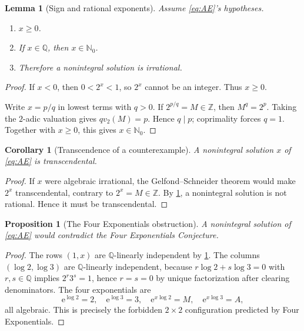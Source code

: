 \documentclass[11pt,oneside]{article}
\newtheorem{proposition}[theorem]{Proposition}
\newtheorem{lemma}[theorem]{Lemma}
\newtheorem{corollary}[theorem]{Corollary}
\theoremstyle{definition}
\theoremstyle{remark}
\newcommand{\Nzero}{\mathbb N_0}
\newcommand{\Z}{\mathbb Z}
\newcommand{\Q}{\mathbb Q}
\newcommand{\e}{\mathrm e}
\begin{document}
\begin{lemma}[Sign and rational exponents]
\label{lem:basic}
Assume \eqref{eq:AE}'s hypotheses.
\begin{enumerate}[label=(\roman*)]
\item \(x\ge0\).
\item If \(x\in\Q\), then \(x\in\Nzero\).
\item Therefore a nonintegral solution is irrational.
\end{enumerate}
\end{lemma}

\begin{proof}
If \(x<0\), then \(0<2^x<1\), so \(2^x\) cannot be an integer.  Thus \(x\ge0\).

Write \(x=p/q\) in lowest terms with \(q>0\).  If \(2^{p/q}=M\in\Z\), then
\(M^q=2^p\).  Taking the \(2\)-adic valuation gives
\(qv_2(M)=p\).  Hence \(q\mid p\); coprimality forces \(q=1\).  Together with \(x\ge0\), this gives \(x\in\Nzero\).
\end{proof}

\begin{corollary}[Transcendence of a counterexample]
\label{cor:transx}
A nonintegral solution \(x\) of \eqref{eq:AE} is transcendental.
\end{corollary}

\begin{proof}
If \(x\) were algebraic irrational, the Gelfond--Schneider theorem would make \(2^x\) transcendental, contrary to \(2^x=M\in\Z\).  By \cref{lem:basic}, a nonintegral solution is not rational.  Hence it must be transcendental.
\end{proof}

\begin{proposition}[The Four Exponentials obstruction]
\label{prop:FEC}
A nonintegral solution of \eqref{eq:AE} would contradict the Four Exponentials Conjecture.
\end{proposition}

\begin{proof}
The rows \((1,x)\) are \(\Q\)-linearly independent by \cref{lem:basic}.  The columns \((\log2,\log3)\) are \(\Q\)-linearly independent, because
\(r\log2+s\log3=0\) with \(r,s\in\Q\) implies \(2^r3^s=1\), hence \(r=s=0\) by unique factorization after clearing denominators.  The four exponentials are
\[
  \e^{\log2}=2,\quad \e^{\log3}=3,\quad
  \e^{x\log2}=M,\quad \e^{x\log3}=A,
\]
all algebraic.  This is precisely the forbidden \(2\times2\) configuration predicted by Four Exponentials.
\end{proof}
\end{document}
